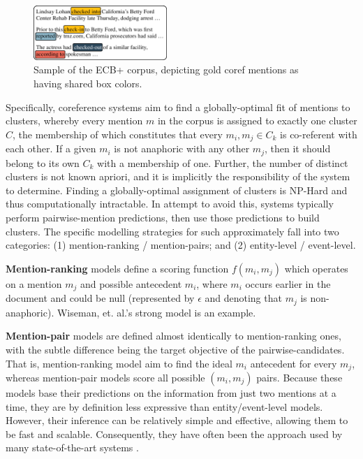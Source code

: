 \documentclass[11pt,a4paper]{article}
\begin{document}
\begin{figure}[ht]
\centering
	\includegraphics[width=0.45\textwidth]{corpus}
	\caption{Sample of the ECB+ corpus, depicting gold coref mentions as having shared box colors.}
	\label{fig:corpus}
\end{figure}

Specifically, coreference systems aim to find a globally-optimal fit of mentions to clusters, whereby every mention $m$ in the corpus is assigned to exactly one cluster $C$, the membership of which constitutes that every ${m_i,m_j} \in C_k$ is co-referent with each other.  If a given $m_i$ is not anaphoric with any other $m_j$, then it should belong to its own $C_k$ with a membership of one.  Further, the number of distinct clusters is not known apriori, and it is implicitly the responsibility of the system to determine.  Finding a globally-optimal assignment of clusters is NP-Hard and thus computationally intractable.  In attempt to avoid this, systems typically perform pairwise-mention predictions, then use those predictions to build clusters. The specific modelling strategies for such approximately fall into two categories: (1) mention-ranking / mention-pairs; and (2) entity-level / event-level.

\textbf{Mention-ranking} models define a scoring function $f(m_i,m_j)$ which operates on a mention $m_j$ and possible antecedent $m_i$, where $m_i$ occurs earlier in the document and could be null (represented by $\epsilon$ and denoting that $m_j$ is non-anaphoric).  Wiseman, et. al.'s  strong model is an example.

\textbf{Mention-pair} models are defined almost identically to mention-ranking ones, with the subtle difference being the target objective of the pairwise-candidates.  That is, mention-ranking model aim to find the ideal $m_i$ antecedent for every $m_j$, whereas mention-pair models score all possible $(m_i,m_j)$ pairs.  Because these models base their predictions on the information from just two mentions at a time, they are by definition less expressive than entity/event-level models.  However, their inference can be relatively simple and effective, allowing them to be fast and scalable.  Consequently, they have often been the approach used by many state-of-the-art systems \cite{Soon:2001:MLA:972597.972602,DBLP:conf/emnlp/DurrettK13}.
\end{document}
